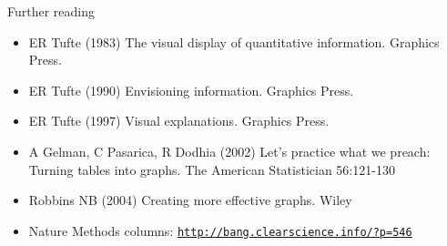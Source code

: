 \documentclass[12pt]{article}
\newcommand{\headsize}{\fontsize{35}{35} \selectfont}
\newcommand{\smallestsize}{\fontsize{18}{22} \selectfont}
\begin{document}
\newpage


\headsize \color{yellow}
\hfill \begin{minipage}{5.75in}
\centering
Further reading
\end{minipage}

\vspace{30mm}
\smallestsize \color{white}

\hspace{0.5in} \begin{minipage}[t]{9in}
\begin{itemize}

\itemsep12pt

\item ER Tufte (1983) The visual display of quantitative information.
Graphics Press.
\item ER Tufte (1990) Envisioning information. Graphics Press.
\item ER Tufte (1997) Visual explanations. Graphics Press.

\vspace*{8mm}

\item A Gelman, C Pasarica, R Dodhia (2002) Let's practice what we preach:
Turning tables into graphs. The American Statistician 56:121-130

\vspace*{8mm}

\item Robbins NB (2004) Creating more effective graphs. Wiley

\vspace*{8mm}

\item Nature Methods columns: \href{http://bang.clearscience.info/?p=546}{\tt http://bang.clearscience.info/?p=546}

\end{itemize}
\end{minipage}
\end{document}

